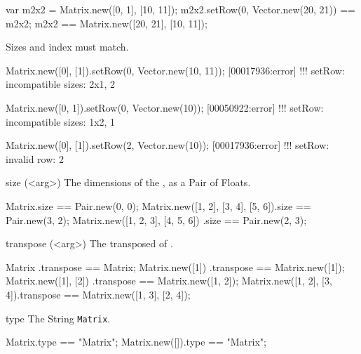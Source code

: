 \begin{urbiscriptapi}
\begin{urbiassert}
var m2x2 = Matrix.new([0, 1], [10, 11]);
m2x2.setRow(0, Vector.new(20, 21)) == m2x2;
m2x2 == Matrix.new([20, 21], [10, 11]);
\end{urbiassert}

  Sizes and index must match.
\begin{urbiscript}
Matrix.new([0], [1]).setRow(0, Vector.new(10, 11));
[00017936:error] !!! setRow: incompatible sizes: 2x1, 2

Matrix.new([0, 1]).setRow(0, Vector.new(10));
[00050922:error] !!! setRow: incompatible sizes: 1x2, 1

Matrix.new([0], [1]).setRow(2, Vector.new(10));
[00017936:error] !!! setRow: invalid row: 2
\end{urbiscript}


\item[size](<arg>)%
  The dimensions of the \this, as a Pair of Floats.
\begin{urbiassert}
Matrix.size == Pair.new(0, 0);
Matrix.new([1, 2], [3, 4], [5, 6]).size == Pair.new(3, 2);
Matrix.new([1, 2, 3], [4, 5, 6])  .size == Pair.new(2, 3);
\end{urbiassert}


\item[transpose](<arg>)%
  The transposed of \this.
\begin{urbiassert}
Matrix                    .transpose == Matrix;
Matrix.new([1])           .transpose == Matrix.new([1]);
Matrix.new([1], [2])      .transpose == Matrix.new([1, 2]);
Matrix.new([1, 2], [3, 4]).transpose == Matrix.new([1, 3], [2, 4]);
\end{urbiassert}


\item[type]%
  The String \lstinline|Matrix|.
\begin{urbiassert}
Matrix.type         == "Matrix";
Matrix.new([]).type == "Matrix";
\end{urbiassert}
\end{urbiscriptapi}


